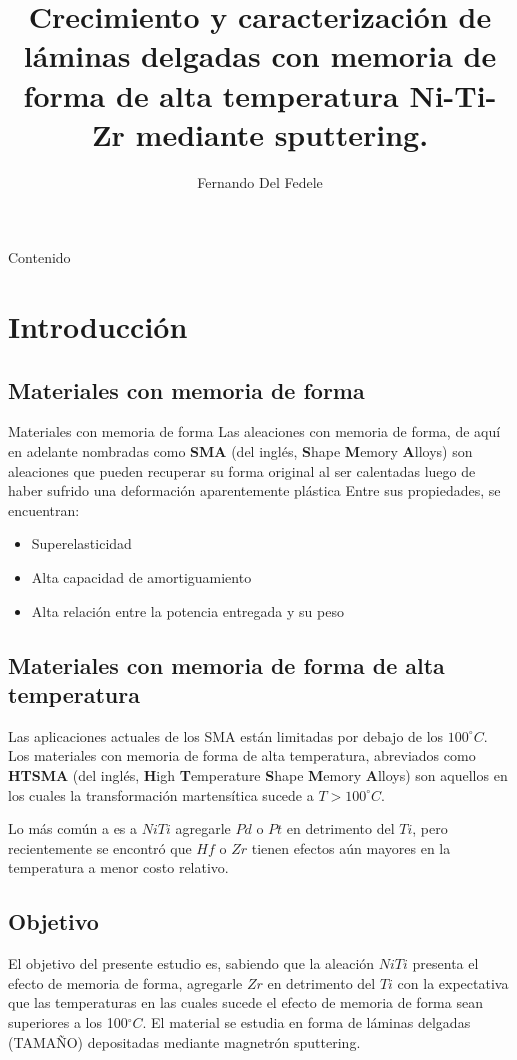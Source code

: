 \documentclass[11pt]{beamer}
\author{Fernando Del Fedele}
\title{Crecimiento y caracterización de
láminas delgadas con memoria de
forma de alta temperatura Ni-Ti-Zr
mediante sputtering.}
\begin{document}
\begin{frame}
\titlepage
\end{frame}

\begin{frame}{Contenido}
\tableofcontents
\end{frame}

\section{Introducción}

	\subsection{Materiales con memoria de forma}
		\begin{frame}{Materiales con memoria de forma}
			Las aleaciones con memoria de forma, de aquí en adelante nombradas como \textbf{SMA} (del inglés, \textbf{S}hape \textbf{M}emory \textbf{A}lloys) son aleaciones que pueden recuperar su forma original al ser calentadas luego de haber sufrido una deformación aparentemente plástica
			Entre sus propiedades, se encuentran:
			\begin{itemize}
				\item Superelasticidad
				\item Alta capacidad de amortiguamiento
				\item Alta relación entre la potencia entregada y su peso
			\end{itemize}
		\end{frame}
		
	\subsection{Materiales con memoria de forma de alta temperatura}
		\begin{frame}
			Las aplicaciones actuales de los SMA están limitadas por debajo de los $100^\circ C$. Los materiales con memoria de forma de alta temperatura, abreviados como \textbf{HTSMA} (del inglés, \textbf{H}igh \textbf{T}emperature \textbf{S}hape \textbf{M}emory \textbf{A}lloys) son aquellos en los cuales la transformación martensítica sucede a $T > 100^\circ C$.
			
			Lo más común a es a $NiTi$ agregarle $Pd$ o $Pt$ en detrimento del $Ti$, pero recientemente se encontró que $Hf$ o $Zr$ tienen efectos aún mayores en la temperatura a menor costo relativo.
		\end{frame}
	\subsection{Objetivo}
		\begin{frame}
			El objetivo del presente estudio es, sabiendo que la aleación $NiTi$ presenta el efecto de memoria de forma, agregarle $Zr$ en detrimento del $Ti$ con la expectativa que las temperaturas en las cuales sucede el efecto de memoria de forma sean superiores a los 100$^\circ C$. El material se estudia en forma de láminas delgadas (TAMAÑO) depositadas mediante magnetrón sputtering.
		\end{frame}
	
\end{document}
